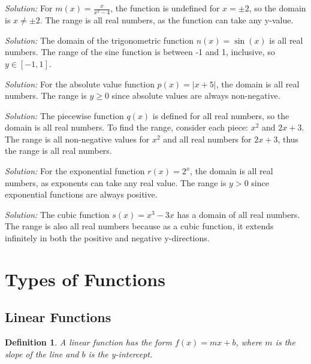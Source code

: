 \documentclass[a4paper,12pt]{book}
\newenvironment{solution}[1][]
{\par\noindent\textit{Solution:} \rmfamily}{\medskip}
\newtheorem{definition}{Definition}
\begin{document}
\begin{solution}[5]
For \( m(x) = \frac{x}{x^2 - 4} \), the function is undefined for \( x = \pm 2 \), so the domain is \( x \neq \pm 2 \). The range is all real numbers, as the function can take any y-value.
\end{solution}

\begin{solution}[6]
The domain of the trigonometric function \( n(x) = \sin(x) \) is all real numbers. The range of the sine function is between -1 and 1, inclusive, so \( y \in [-1, 1] \).
\end{solution}

\begin{solution}[7]
For the absolute value function \( p(x) = |x + 5| \), the domain is all real numbers. The range is \( y \geq 0 \) since absolute values are always non-negative.
\end{solution}

\begin{solution}[8]
The piecewise function \( q(x) \) is defined for all real numbers, so the domain is all real numbers. To find the range, consider each piece: \( x^2 \) and \( 2x + 3 \). The range is all non-negative values for \( x^2 \) and all real numbers for \( 2x + 3 \), thus the range is all real numbers.
\end{solution}

\begin{solution}[9]
For the exponential function \( r(x) = 2^x \), the domain is all real numbers, as exponents can take any real value. The range is \( y > 0 \) since exponential functions are always positive.
\end{solution}

\begin{solution}[10]
The cubic function \( s(x) = x^3 - 3x \) has a domain of all real numbers. The range is also all real numbers because as a cubic function, it extends infinitely in both the positive and negative y-directions.
\end{solution}


\section{Types of Functions}
\subsection{Linear Functions}
\begin{definition}
A linear function has the form \( f(x) = mx + b \), where \( m \) is the slope of the line and \( b \) is the y-intercept.
\end{definition}
\end{document}
